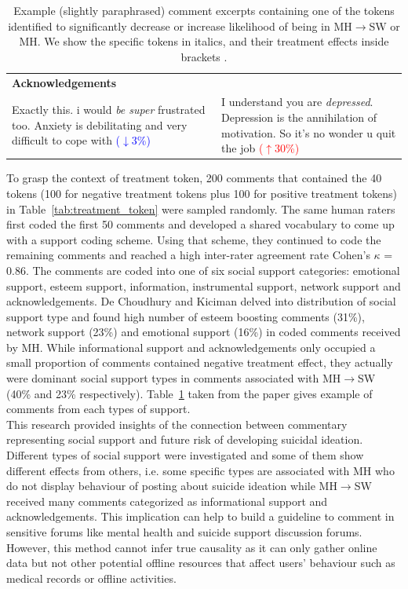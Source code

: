 \begin{table}
\begin{tabularx}{\textwidth}{XX}
\rowcolor{gray}
\textbf{Acknowledgements}&\\
Exactly this. i would \textit{be super} frustrated too. Anxiety is debilitating and very difficult to cope with \textcolor{blue}{($\downarrow$3\%)} & I understand you are \textit{depressed}. Depression is the annihilation of motivation. So it's no wonder u quit the job \textcolor{red}{($\uparrow$30\%)} \\
\bottomrule
\end{tabularx}
\caption{Example (slightly paraphrased) comment excerpts containing one of the tokens identified to significantly decrease or increase likelihood of being in MH$\rightarrow$SW or MH. We show the specific tokens in italics, and their treatment effects inside brackets \cite{DeChoudhury2017}.}
\label{tab:treatment_context}
\end{table}
To grasp the context of treatment token, 200 comments that contained the 40 tokens (100 for negative treatment tokens plus 100 for positive treatment tokens) in Table~\ref{tab:treatment_token} were sampled randomly. The same human raters first coded the first 50 comments and developed a shared vocabulary to come up with a support coding scheme. Using that scheme, they continued to code the remaining comments and reached a high inter-rater agreement rate Cohen’s $\kappa$ = 0.86. The comments are coded into one of six social support categories: emotional support, esteem support, information, instrumental support, network support and acknowledgements. De Choudhury and Kiciman delved into distribution of social support type and found high number of esteem boosting comments (31\%), network support (23\%) and emotional support (16\%) in coded comments received by MH. While informational support and acknowledgements only occupied a small proportion of comments contained negative treatment effect, they actually were dominant social support types in comments associated with MH$\rightarrow$SW (40\% and 23\% respectively). Table~\ref{tab:treatment_context} taken from the paper \cite{DeChoudhury2017} gives example of comments from each types of support.\\
This research provided insights of the connection between commentary representing social support and future risk of developing suicidal ideation. Different types of social support were investigated and some of them show different effects from others, i.e. some specific types are associated with MH who do not display behaviour of posting about suicide ideation while MH$\rightarrow$SW received many comments categorized as informational support and acknowledgements. This implication can help to build a guideline to comment in sensitive forums like mental health and suicide support discussion forums. However, this method cannot infer true causality as it can only gather online data but not other potential offline resources that affect users' behaviour such as medical records or offline activities.\\

